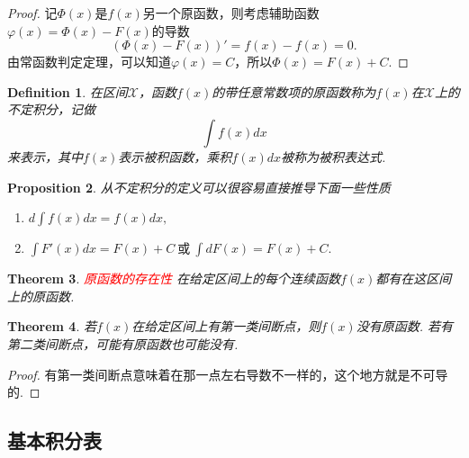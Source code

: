 \documentclass{article}
\newtheorem{theorem}{Theorem}[section]
\newtheorem{proposition}[theorem]{Proposition}
\newtheorem{definition}[theorem]{Definition}
\newcommand{\redt}[1]{\textcolor{red}{#1}}
\begin{document}
\begin{proof}
记$\Phi(x)$是$f(x)$另一个原函数，则考虑辅助函数$\varphi(x) = \Phi(x) - F(x)$的导数
$$
(\Phi(x)-F(x))' = f(x)-f(x) = 0.
$$
由常函数判定定理，可以知道$\varphi(x) = C$，所以$\Phi(x) = F(x) + C$.
\end{proof}

\begin{definition}
\rm 在区间$\mathcal{X}$，函数$f(x)$的带任意常数项的原函数称为$f(x)$在$\mathcal{X}$上的{\color{red}不定积分}，记做
$$
\int f(x)dx
$$
来表示，其中$f(x)$表示{\color{red}被积函数}，乘积$f(x)dx$被称为{\color{red}被积表达式}.
\end{definition}

\begin{proposition}
\rm 从不定积分的定义可以很容易直接推导下面一些性质
\begin{enumerate}
	\item $d\int f(x)dx = f(x)dx,$
	\item $\int F'(x)dx = F(x)+C~\text{或}~\int dF(x) = F(x)+C.$
\end{enumerate}
\end{proposition}

\begin{theorem}
\rm \redt{原函数的存在性} 在给定区间上的每个连续函数$f(x)$都有在这区间上的原函数.
\end{theorem}

\begin{theorem}
\rm 若$f(x)$在给定区间上有第一类间断点，则$f(x)$没有原函数. 若有第二类间断点，可能有原函数也可能没有.  
\end{theorem}

\begin{proof}
有第一类间断点意味着在那一点左右导数不一样的，这个地方就是不可导的. 
\end{proof}

\newpage
\subsection{基本积分表}
\end{document}
